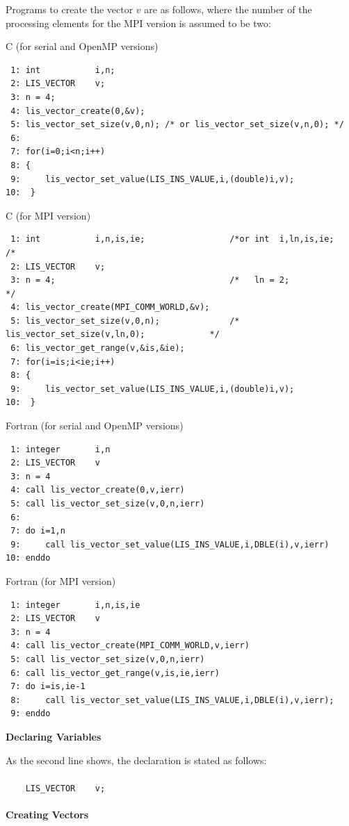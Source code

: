 \documentclass[a4paper]{article}
\begin{document}
Programs to create the vector $v$ are as follows, 
where the number of the processing elements for the MPI version is assumed to be two:
\begin{itembox}[l]{C (for serial and OpenMP versions)}
\small
\begin{verbatim}
 1: int           i,n;
 2: LIS_VECTOR    v;
 3: n = 4;
 4: lis_vector_create(0,&v);
 5: lis_vector_set_size(v,0,n); /* or lis_vector_set_size(v,n,0); */ 
 6:
 7: for(i=0;i<n;i++)
 8: {
 9:     lis_vector_set_value(LIS_INS_VALUE,i,(double)i,v);
10:  }
\end{verbatim}
\end{itembox}
\begin{itembox}[l]{C (for MPI version)}
\small
\begin{verbatim}
 1: int           i,n,is,ie;                 /*or int  i,ln,is,ie;                         /*
 2: LIS_VECTOR    v;
 3: n = 4;                                   /*   ln = 2;                                  */
 4: lis_vector_create(MPI_COMM_WORLD,&v);
 5: lis_vector_set_size(v,0,n);              /*   lis_vector_set_size(v,ln,0);             */
 6: lis_vector_get_range(v,&is,&ie);
 7: for(i=is;i<ie;i++)
 8: {
 9:     lis_vector_set_value(LIS_INS_VALUE,i,(double)i,v);
10:  }
\end{verbatim}
\end{itembox}
\begin{itembox}[l]{Fortran (for serial and OpenMP versions)}
\small
\begin{verbatim}
 1: integer       i,n
 2: LIS_VECTOR    v
 3: n = 4
 4: call lis_vector_create(0,v,ierr)
 5: call lis_vector_set_size(v,0,n,ierr)  
 6:
 7: do i=1,n
 9:     call lis_vector_set_value(LIS_INS_VALUE,i,DBLE(i),v,ierr)
10: enddo
\end{verbatim}
\end{itembox}
\begin{itembox}[l]{Fortran (for MPI version)}
\small
\begin{verbatim}
 1: integer       i,n,is,ie                 
 2: LIS_VECTOR    v
 3: n = 4                                   
 4: call lis_vector_create(MPI_COMM_WORLD,v,ierr)
 5: call lis_vector_set_size(v,0,n,ierr)              
 6: call lis_vector_get_range(v,is,ie,ierr)
 7: do i=is,ie-1
 8:     call lis_vector_set_value(LIS_INS_VALUE,i,DBLE(i),v,ierr);
 9: enddo
\end{verbatim}
\end{itembox}
\newpage
\noindent
{\bf Declaring Variables}

As the second line shows, the declaration is stated as follows:\\ \\
\verb|    LIS_VECTOR    v;|\\
\\ 
\noindent
{\bf Creating Vectors}
\end{document}
